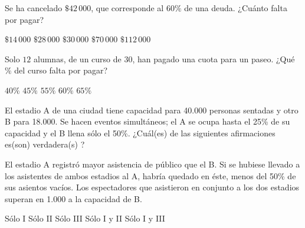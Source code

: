 \documentclass[sin fecha]{srs}
\begin{document}
\begin{preguntas}[after-item-skip=1cm]
\pregunta Se ha cancelado $\$42\,000$, que corresponde al $60\%$ de una deuda. ¿Cuánto falta por pagar?
\begin{vertical}
\alternativa $\$14\,000$
\alternativa $\$28\,000$
\alternativa $\$30\,000$
\alternativa $\$70\,000$
\alternativa $\$112\,000$
\end{vertical}

\pregunta Solo $12$ alumnas, de un curso de $30$, han pagado una cuota para un paseo. ¿Qué $\%$ del curso falta por pagar?
\begin{vertical}
\alternativa $40\%$
\alternativa $45\%$
\alternativa $55\%$
\alternativa $60\%$
\alternativa $65\%$
\end{vertical}

\pregunta El estadio A de una ciudad tiene capacidad para 40.000 personas sentadas y otro B para 18.000. Se hacen eventos simultáneos; el A se ocupa hasta el 25\% de su capacidad y el B llena sólo el 50\%. ¿Cuál(es) de las siguientes afirmaciones es(son) verdadera(s) ?
\begin{verticali}
\alternativa El estadio A registró mayor asistencia de público que el B.
\alternativa Si se hubiese llevado a los asistentes de ambos estadios al A, habría quedado en éste, menos del 50\% de sus asientos vacíos.
\alternativa Los espectadores que asistieron en conjunto a los dos estadios superan en 1.000 a la capacidad de B.
\end{verticali}
\begin{vertical}
\alternativa Sólo I
\alternativa Sólo II
\alternativa Sólo III
\alternativa Sólo I y II
\alternativa Sólo I y III
\end{vertical}


\end{preguntas}
\end{document}
